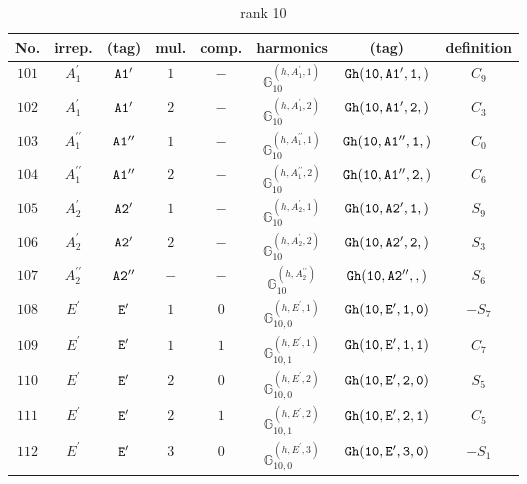 \documentclass[fleqn,8pt]{jsarticle}
\begin{document}
\begin{table}[ht!]
\begin{center}
\caption{rank 10}
\renewcommand{\arraystretch}{1.3}
\begin{tabular}{cccccccc} \hline \hline
No. & irrep. & (tag) & mul. & comp. & harmonics & (tag) & definition \\ \hline
$ 101 $ & $ A_{1}^{\prime} $ & $ {\tt A1'} $ & $ 1 $ & $ - $ & $ \mathbb{G}_{10}^{(h,A_{1}^{\prime},1)} $ & $ {\tt Gh(10,A1',1,)} $ & $ C_{9} $ \\
$ 102 $ & $ A_{1}^{\prime} $ & $ {\tt A1'} $ & $ 2 $ & $ - $ & $ \mathbb{G}_{10}^{(h,A_{1}^{\prime},2)} $ & $ {\tt Gh(10,A1',2,)} $ & $ C_{3} $ \\
$ 103 $ & $ A_{1}^{\prime\prime} $ & $ {\tt A1''} $ & $ 1 $ & $ - $ & $ \mathbb{G}_{10}^{(h,A_{1}^{\prime\prime},1)} $ & $ {\tt Gh(10,A1'',1,)} $ & $ C_{0} $ \\
$ 104 $ & $ A_{1}^{\prime\prime} $ & $ {\tt A1''} $ & $ 2 $ & $ - $ & $ \mathbb{G}_{10}^{(h,A_{1}^{\prime\prime},2)} $ & $ {\tt Gh(10,A1'',2,)} $ & $ C_{6} $ \\
$ 105 $ & $ A_{2}^{\prime} $ & $ {\tt A2'} $ & $ 1 $ & $ - $ & $ \mathbb{G}_{10}^{(h,A_{2}^{\prime},1)} $ & $ {\tt Gh(10,A2',1,)} $ & $ S_{9} $ \\
$ 106 $ & $ A_{2}^{\prime} $ & $ {\tt A2'} $ & $ 2 $ & $ - $ & $ \mathbb{G}_{10}^{(h,A_{2}^{\prime},2)} $ & $ {\tt Gh(10,A2',2,)} $ & $ S_{3} $ \\
$ 107 $ & $ A_{2}^{\prime\prime} $ & $ {\tt A2''} $ & $ - $ & $ - $ & $ \mathbb{G}_{10}^{(h,A_{2}^{\prime\prime})} $ & $ {\tt Gh(10,A2'',,)} $ & $ S_{6} $ \\
$ 108 $ & $ E^{\prime} $ & $ {\tt E'} $ & $ 1 $ & $ 0 $ & $ \mathbb{G}_{10,0}^{(h,E^{\prime},1)} $ & $ {\tt Gh(10,E',1,0)} $ & $ - S_{7} $ \\
$ 109 $ & $ E^{\prime} $ & $ {\tt E'} $ & $ 1 $ & $ 1 $ & $ \mathbb{G}_{10,1}^{(h,E^{\prime},1)} $ & $ {\tt Gh(10,E',1,1)} $ & $ C_{7} $ \\
$ 110 $ & $ E^{\prime} $ & $ {\tt E'} $ & $ 2 $ & $ 0 $ & $ \mathbb{G}_{10,0}^{(h,E^{\prime},2)} $ & $ {\tt Gh(10,E',2,0)} $ & $ S_{5} $ \\
$ 111 $ & $ E^{\prime} $ & $ {\tt E'} $ & $ 2 $ & $ 1 $ & $ \mathbb{G}_{10,1}^{(h,E^{\prime},2)} $ & $ {\tt Gh(10,E',2,1)} $ & $ C_{5} $ \\
$ 112 $ & $ E^{\prime} $ & $ {\tt E'} $ & $ 3 $ & $ 0 $ & $ \mathbb{G}_{10,0}^{(h,E^{\prime},3)} $ & $ {\tt Gh(10,E',3,0)} $ & $ - S_{1} $ \\

\end{tabular}
\end{center}
\end{table}
\end{document}
